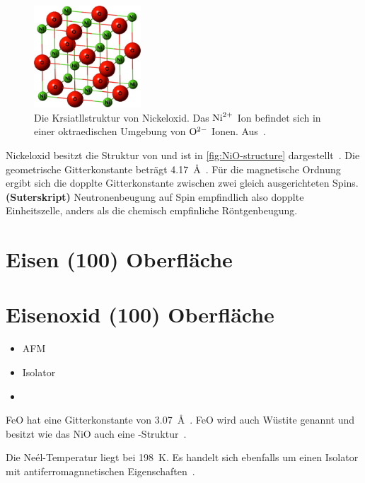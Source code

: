         \begin{figure}
            \centering
            \includegraphics[width=4cm]{./content/NiO-structure}
            \caption{Die Krsiatllstruktur von Nickeloxid. Das $\ce{Ni}^{2+}$ Ion befindet sich in einer oktraedischen Umgebung von $\ce{O}^{2-}$ Ionen. Aus~\cite{NiO-structure}.}
            \label{fig:NiO-structure}
        \end{figure}

        Nickeloxid besitzt die Struktur von  und ist in \autoref{fig:NiO-structure} dargestellt~\cite{kunz_chemisorption_1985}. 
        Die geometrische Gitterkonstante beträgt \SI{4.17}{\angstrom}~\cite{sebbari_uranyl_2012}.
        Für die magnetische Ordnung ergibt sich die dopplte Gitterkonstante zwischen zwei gleich ausgerichteten Spins. \textbf{(Suterskript)}
        Neutronenbeugung auf Spin empfindlich also dopplte Einheitszelle, anders als die chemisch empfinliche Röntgenbeugung.
    
    \section{Eisen (100) Oberfläche}

    \section{Eisenoxid (100) Oberfläche}
        \begin{itemize}
            \item AFM
            \item Isolator
            \item 
        \end{itemize}
        FeO hat eine Gitterkonstante von \SI{3.07}{\angstrom}~\cite{FeO_1}.
        FeO wird auch Wüstite genannt und besitzt wie das NiO auch eine -Struktur~\cite{FeO_4}.
        
        Die Neél-Temperatur liegt bei \SI{198}{\kelvin}.
        Es handelt sich ebenfalls um einen Isolator mit antiferromagnnetischen Eigenschaften~\cite{FeO_4}.

